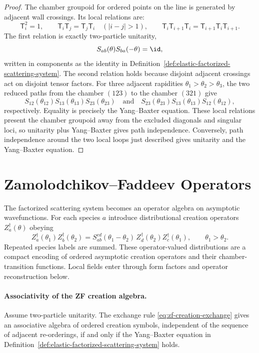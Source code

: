 \begin{proof}
The chamber groupoid for ordered points on the line is generated by adjacent
wall crossings.  Its local relations are:
\[
  \mathsf T_i^2=1,\qquad
  \mathsf T_i\mathsf T_j=\mathsf T_j\mathsf T_i\quad (|i-j|>1),
  \qquad
  \mathsf T_i\mathsf T_{i+1}\mathsf T_i
  =
  \mathsf T_{i+1}\mathsf T_i\mathsf T_{i+1}.
\]
The first relation is exactly two-particle unitarity,
\[
  S_{ab}(\theta)S_{ba}(-\theta)=\id,
\]
written in components as the identity in
Definition~\ref{def:elastic-factorized-scattering-system}.  The second
relation holds because disjoint adjacent crossings act on disjoint tensor
factors.  For three adjacent rapidities
\(\theta_1>\theta_2>\theta_3\), the two reduced paths from the chamber
\((123)\) to the chamber \((321)\) give
\[
  S_{12}(\theta_{12})S_{13}(\theta_{13})S_{23}(\theta_{23})
  \quad\text{and}\quad
  S_{23}(\theta_{23})S_{13}(\theta_{13})S_{12}(\theta_{12}),
\]
respectively.  Equality is precisely the Yang--Baxter equation.  These local
relations present the chamber groupoid away from the excluded diagonals and
singular loci, so unitarity plus Yang--Baxter gives path independence.
Conversely, path independence around the two local loops just described gives
unitarity and the Yang--Baxter equation.
\end{proof}

\section{Zamolodchikov--Faddeev Operators}

The factorized scattering system becomes an operator algebra on asymptotic wavefunctions.
For each species \(a\) introduce distributional creation operators
\(Z_a^\dagger(\theta)\) obeying
\begin{equation}
  Z_a^\dagger(\theta_1)Z_b^\dagger(\theta_2)
  =
  S_{ab}^{cd}(\theta_1-\theta_2)\,
  Z_d^\dagger(\theta_2)Z_c^\dagger(\theta_1),
  \qquad \theta_1>\theta_2 .
  \label{eq:zf-creation-exchange}
\end{equation}
Repeated species labels are summed.  These operator-valued distributions are
a compact encoding of ordered asymptotic creation operators and their
chamber-transition functions.  Local fields enter through form factors and
operator reconstruction below.

\paragraph{Associativity of the ZF creation algebra.}
Assume two-particle unitarity.  The exchange rule
\eqref{eq:zf-creation-exchange} gives an associative algebra of ordered
creation symbols, independent of the sequence of adjacent re-orderings, if
and only if the Yang--Baxter equation in
Definition~\ref{def:elastic-factorized-scattering-system} holds.

